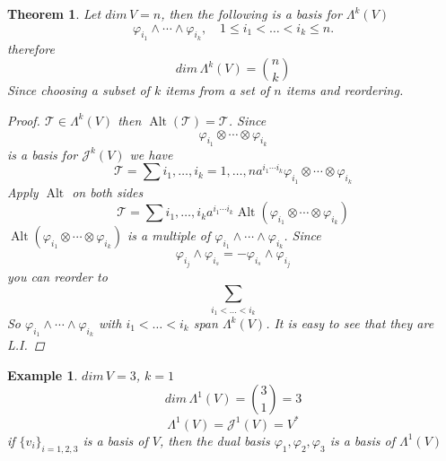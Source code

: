 \documentclass[12pt]{article}
\def\maj{\mathcal{J}}
\def\mat{\mathcal{T}}
\DeclareMathOperator{\alt}{Alt}
\newtheorem{theorem}{Theorem}[section]
\newtheorem{example}{Example}[section]
\begin{document}
\begin{theorem}
Let $dim\, V = n$, then the following is a basis for $\Lambda^k(V)$
\[\varphi_{i_1}\wedge\cdots\wedge\varphi_{i_k}, \quad 1 \leq i_1 < \dots < i_k \leq n. \]
therefore
\[dim\, \Lambda^k(V) = {n \choose k}\] Since choosing a subset of $k$ items from a set of $n$ items and reordering.
\begin{proof}
$\mat \in \Lambda^k(V)$ then $\alt(\mat) = \mat$. Since \[\varphi_{i_1} \otimes \cdots \otimes \varphi_{i_k}\] is a basis for $\maj^k(V)$ we have
\[\mat = \sum\limits{i_1, \dots , i _k = 1, \dots , n}a^{i_1\cdots i_k}\varphi_{i_1} \otimes \cdots \otimes \varphi_{i_k}\]
Apply $\alt$ on both sides
\[ \mat = \sum\limits{i_1, \dots , i _k}a^{i_1\cdots i_k}\alt(\varphi_{i_1} \otimes \cdots \otimes \varphi_{i_k})\]
$\alt(\varphi_{i_1} \otimes \cdots \otimes \varphi_{i_k})$ is a multiple of $\varphi_{i_1}\wedge\cdots\wedge\varphi_{i_k}$. Since 
\[\varphi_{i_j}\wedge\varphi_{i_s} = - \varphi_{i_s}\wedge\varphi_{i_j}\]
you can reorder to 
\[\sum\limits_{i_1 < \dots < i_k}\]
So $\varphi_{i_1}\wedge\cdots\wedge\varphi_{i_k}$ with $i_1 <\dots<i_k$ span $\Lambda^k(V)$. It is easy to see that they are L.I.
\end{proof}
\end{theorem}

\begin{example}
$dim\,V = 3$, $k=1$
\[dim\,\Lambda^1(V) = {3 \choose 1} = 3\]
\[\Lambda^1(V) = \maj^1(V) = V^{*}\]
if $\{v_i\}_{i=1,2,3}$ is a basis of $V$, then the dual basis $\varphi_1, \varphi_2, \varphi_3$ is a basis of $\Lambda^1(V)$
\end{example}
\end{document}
